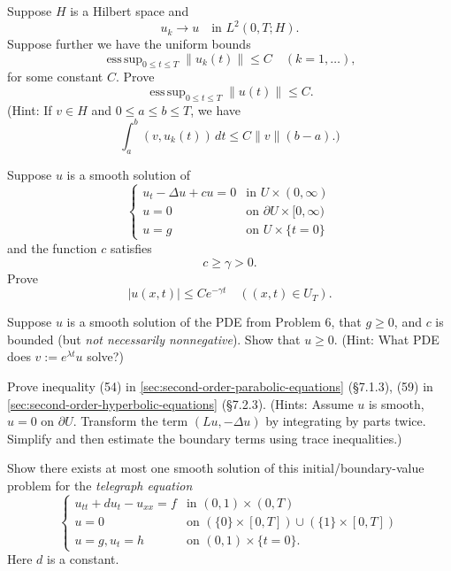 \begin{exercise}
Suppose $H$ is a Hilbert space and
\[
u_k \to u \quad \text{in } L^2(0,T;H).
\]
Suppose further we have the uniform bounds
\[
\operatorname{ess\,sup}_{0 \leq t \leq T} \|u_k(t)\| \leq C \quad (k = 1, \ldots),
\]
for some constant $C$. Prove
\[
\operatorname{ess\,sup}_{0 \leq t \leq T} \|u(t)\| \leq C.
\]
(Hint: If $v \in H$ and $0 \leq a \leq b \leq T$, we have
\[
\int_a^b (v, u_k(t)) \, dt \leq C \|v\| (b - a).)
\]
\end{exercise}

\begin{exercise}
Suppose $u$ is a smooth solution of
\[
\begin{cases}
u_t - \Delta u + cu = 0 & \text{in } U \times (0, \infty) \\
u = 0 & \text{on } \partial U \times [0, \infty) \\
u = g & \text{on } U \times \{t = 0\}
\end{cases}
\]
and the function $c$ satisfies
\[
c \geq \gamma > 0.
\]
Prove
\[
|u(x,t)| \leq Ce^{-\gamma t} \quad ((x,t) \in U_T).
\]
\end{exercise}

\begin{exercise}
Suppose $u$ is a smooth solution of the PDE from Problem 6, that $g \geq 0$, and $c$ is bounded (but \textit{not necessarily nonnegative}). Show that $u \geq 0$. (Hint: What PDE does $v := e^{\lambda t}u$ solve?)
\end{exercise}

\begin{exercise}
Prove inequality (54) in \cref{sec:second-order-parabolic-equations} (\S7.1.3), (59) in \cref{sec:second-order-hyperbolic-equations} (\S7.2.3). (Hints: Assume $u$ is smooth, $u = 0$ on $\partial U$. Transform the term $(Lu, -\Delta u)$ by integrating by parts twice. Simplify and then estimate the boundary terms using trace inequalities.)
\end{exercise}

\begin{exercise}
Show there exists at most one smooth solution of this initial/boundary-value problem for the \textit{telegraph equation}
\[
\begin{cases}
u_{tt} + du_t - u_{xx} = f & \text{in } (0,1) \times (0,T) \\
u = 0 & \text{on } (\{0\} \times [0,T]) \cup (\{1\} \times [0,T]) \\
u = g, u_t = h & \text{on } (0,1) \times \{t = 0\}.
\end{cases}
\]
Here $d$ is a constant.
\end{exercise}

